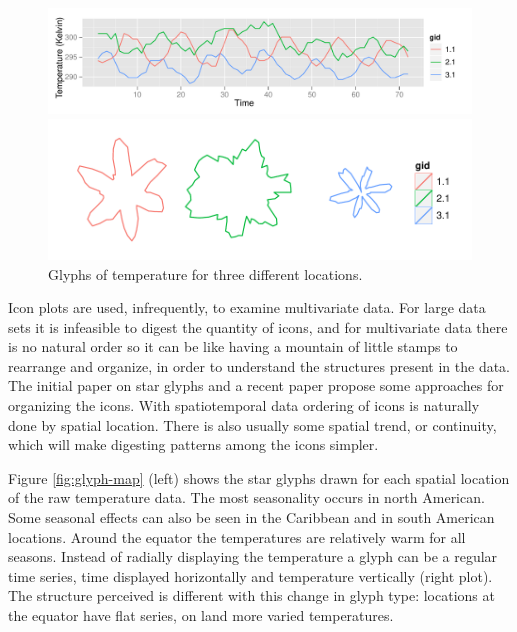 \documentclass[oneside]{article}
\begin{document}
\begin{figure}[htp]
\centerline{\includegraphics[width=6in]{nasa-glyph-ts.pdf}}
\centerline{\includegraphics[width=6in]{nasa-glyph.pdf}}
\caption{Glyphs of temperature for three different locations.}
\label{fig:glyphs}
\end{figure}

Icon plots are used, infrequently, to examine multivariate data. For large data sets it is infeasible to digest the quantity of icons, and for multivariate data there is no natural order so it can be like having a mountain of little stamps to rearrange and organize, in order to understand the structures present in the data. The initial paper on star glyphs \citep{kleiner:1981} and a recent paper \citep{hurley:2010} propose some approaches for organizing the icons. With spatiotemporal data ordering of icons is naturally done by spatial location. There is also usually some spatial trend, or continuity, which will make digesting patterns among the icons simpler.

Figure \ref{fig:glyph-map} (left) shows the star glyphs drawn for each spatial location of the raw temperature data. The most seasonality occurs in north American. Some seasonal effects can also be seen in the Caribbean and in south American locations. Around the equator the temperatures are relatively warm for all seasons. Instead of radially displaying the temperature a glyph can be a regular time series, time displayed horizontally and temperature vertically (right plot). The structure perceived is different with this change in glyph type: locations at the equator have flat series, on land more varied temperatures. 
\end{document}
